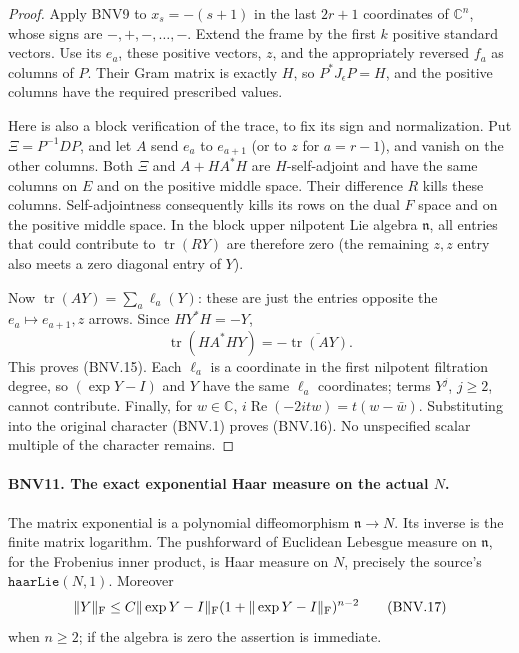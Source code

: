 \begin{proof}
Apply BNV9 to $x_s=-(s+1)$ in the last $2r+1$ coordinates of
$\mathbb C^n$, whose signs are $-,+,-,\ldots,-$.  Extend the frame by the
first $k$ positive standard vectors.  Use its $e_a$, these positive
vectors, $z$, and the appropriately reversed $f_a$ as columns of $P$.
Their Gram matrix is exactly $H$, so $P^*J_\epsilon P=H$, and the
positive columns have the required prescribed values.

Here is also a block verification of the trace, to fix its sign and
normalization.  Put $\Xi=P^{-1}DP$, and let $A$ send $e_a$ to
$e_{a+1}$ (or to $z$ for $a=r-1$), and vanish on the other columns.
Both $\Xi$ and $A+HA^*H$ are $H$-self-adjoint and have the same columns
on $E$ and on the positive middle space.  Their difference $R$ kills
these columns.  Self-adjointness consequently kills its rows on the
dual $F$ space and on the positive middle space.  In the block upper
nilpotent Lie algebra $\mathfrak n$, all entries that could contribute
to $\operatorname{tr}(RY)$ are therefore zero (the remaining $z,z$
entry also meets a zero diagonal entry of $Y$).

Now $\operatorname{tr}(AY)=\sum_a\ell_a(Y)$: these are just the entries
opposite the $e_a\mapsto e_{a+1},z$ arrows.  Since $HY^*H=-Y$,
\[
 \operatorname{tr}(HA^*HY)
 =-\overline{\operatorname{tr}(AY)}.
\]
This proves (BNV.15).  Each $\ell_a$ is a coordinate in the first
nilpotent filtration degree, so $(\exp Y-I)$ and $Y$ have the same
$\ell_a$ coordinates; terms $Y^j$, $j\ge2$, cannot contribute.
Finally, for $w\in\mathbb C$, $i\operatorname{Re}(-2itw)=t(w-\bar w)$.
Substituting into the original character (BNV.1) proves (BNV.16).
No unspecified scalar multiple of the character remains.
\end{proof}

\paragraph{BNV11. The exact exponential Haar measure on the actual $N$.}
\label{claim:BNV11}
The matrix exponential is a polynomial diffeomorphism
$\mathfrak n\longrightarrow N$.  Its inverse is the finite matrix logarithm.
The pushforward of Euclidean Lebesgue measure on $\mathfrak n$, for the
Frobenius inner product, is Haar measure on $N$, precisely the source's
$\texttt{haarLie}(N,1)$.  Moreover
\[
 \|Y\|_{\rm F}\le C\|\exp Y-I\|_{\rm F}
             (1+\|\exp Y-I\|_{\rm F})^{n-2}
 \tag{BNV.17}
\]
when $n\ge2$; if the algebra is zero the assertion is immediate.

